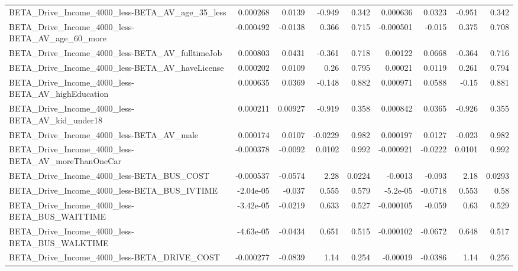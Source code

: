 \begin{tabular}{lrrrrrrrr}
BETA\_Drive\_Income\_4000\_less-BETA\_AV\_age\_35\_less    &    0.000268 &       0.0139 &   -0.949 &    0.342 &   0.000636 &      0.0323 &       -0.951 &         0.342 \\
BETA\_Drive\_Income\_4000\_less-BETA\_AV\_age\_60\_more    &   -0.000492 &      -0.0138 &    0.366 &    0.715 &  -0.000501 &      -0.015 &        0.375 &         0.708 \\
BETA\_Drive\_Income\_4000\_less-BETA\_AV\_fulltimeJob    &    0.000803 &       0.0431 &   -0.361 &    0.718 &    0.00122 &      0.0668 &       -0.364 &         0.716 \\
BETA\_Drive\_Income\_4000\_less-BETA\_AV\_haveLicense    &    0.000202 &       0.0109 &     0.26 &    0.795 &    0.00021 &      0.0119 &        0.261 &         0.794 \\
BETA\_Drive\_Income\_4000\_less-BETA\_AV\_highEducation  &    0.000635 &       0.0369 &   -0.148 &    0.882 &   0.000971 &      0.0588 &        -0.15 &         0.881 \\
BETA\_Drive\_Income\_4000\_less-BETA\_AV\_kid\_under18    &    0.000211 &      0.00927 &   -0.919 &    0.358 &   0.000842 &      0.0365 &       -0.926 &         0.355 \\
BETA\_Drive\_Income\_4000\_less-BETA\_AV\_male           &    0.000174 &       0.0107 &  -0.0229 &    0.982 &   0.000197 &      0.0127 &       -0.023 &         0.982 \\
BETA\_Drive\_Income\_4000\_less-BETA\_AV\_moreThanOneCar &   -0.000378 &      -0.0092 &   0.0102 &    0.992 &  -0.000921 &     -0.0222 &       0.0101 &         0.992 \\
BETA\_Drive\_Income\_4000\_less-BETA\_BUS\_COST          &   -0.000537 &      -0.0574 &     2.28 &   0.0224 &    -0.0013 &      -0.093 &         2.18 &        0.0293 \\
BETA\_Drive\_Income\_4000\_less-BETA\_BUS\_IVTIME        &   -2.04e-05 &       -0.037 &    0.555 &    0.579 &   -5.2e-05 &     -0.0718 &        0.553 &          0.58 \\
BETA\_Drive\_Income\_4000\_less-BETA\_BUS\_WAITTIME      &   -3.42e-05 &      -0.0219 &    0.633 &    0.527 &  -0.000105 &      -0.059 &         0.63 &         0.529 \\
BETA\_Drive\_Income\_4000\_less-BETA\_BUS\_WALKTIME      &   -4.63e-05 &      -0.0434 &    0.651 &    0.515 &  -0.000102 &     -0.0672 &        0.648 &         0.517 \\
BETA\_Drive\_Income\_4000\_less-BETA\_DRIVE\_COST        &   -0.000277 &      -0.0839 &     1.14 &    0.254 &   -0.00019 &     -0.0386 &         1.14 &         0.256 \\

\end{tabular}

